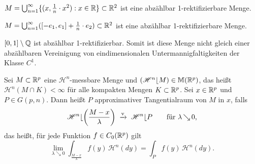 \documentclass[a4paper,twoside,DIV15,BCOR12mm]{scrbook}
\newcommand{\HM}{\mathscr H}
\DeclareMathOperator{\downto}{\searrow}
\newcommand{\MR}{\lfloor}
\begin{document}
\begin{beispiele}
\item $M = \bigcup_{n=1}^\infty \{(x,\frac 1n \cdot x^2) : x\in \mathbb{R}\} \subset \mathbb{R}^2$ ist eine abzählbar  1-rektifizierbare Menge.
\item $M = \bigcup_{n=1}^\infty ([-e_1, e_1] + \frac 1n \cdot e_2) \subset \mathbb{R}^2$ ist eine abzählbar 1-rektifizierbare Menge.
\item $[0,1]\setminus \mathbb{Q} $ ist abzählbar 1-rektifizierbar. Somit ist diese Menge nicht gleich einer 
abzählbaren Vereinigung von eindimensionalen Untermannigfaltigkeiten der Klasse $C^1$.
\end{beispiele}

\begin{definition}
Sei $M\subset \mathbb{R}^p$ eine $\HM^n$-messbare Menge und $(\HM^n\MR M)\in \mathbb M(\MdR^p)$, das heißt $\HM^n(M\cap K) < \infty$ für alle kompakten Mengen $K\subset \mathbb{R}^p$. Sei $x\in\mathbb{R}^p$ und $P\in G(p,n)$. Dann heißt $P$ approximativer Tangentialraum von $M$ in $x$, falls
\[
\HM^n\MR \left(\frac{M-x}{\lambda}\right) \tonach{v} \HM^n\MR P\qquad \text{für $\lambda \downto0$,}
\]
das heißt, für jede Funktion $f\in C_0(\mathbb{R}^p)$ gilt
\[
\lim_{\lambda \downto0} \int_{\frac{M-x}\lambda} f(y)\, \HM^n(dy) = \int_P f(y) \,\HM^n(dy).
\]
\end{definition}
\end{document}
